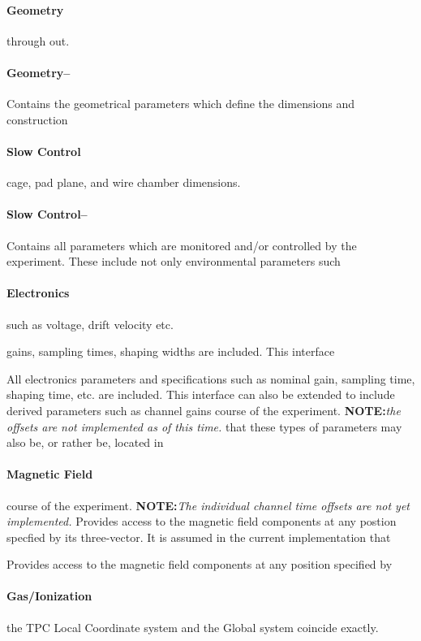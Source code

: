 \documentclass[twoside]{article}
\begin{document}
\paragraph{Geometry}
through out. 

\paragraph{Geometry--}

Contains the
geometrical parameters which define the dimensions and construction
\paragraph{Slow Control}
cage, pad plane, and wire chamber dimensions.

\paragraph{Slow Control--}

Contains all parameters which are monitored and/or controlled by 
the experiment.  These include not only environmental parameters such
\paragraph{Electronics}
such as voltage, drift velocity etc.

gains, sampling times, shaping widths are included.  This interface 

All electronics parameters and specifications such as nominal
gain, sampling time, shaping time, etc. are included.  This interface 
can also be extended to include derived parameters such as channel gains
course of the experiment.  {\bf NOTE:}{\em the offsets are not implemented as of this time.}
that these types of parameters may also be, or rather be, located in
\paragraph{Magnetic Field}
course of the experiment.  {\bf NOTE:}{\em The individual channel time offsets are not yet implemented.}
Provides access to the magnetic field components at any postion specfied by
its three-vector.  It is assumed in the current implementation that

Provides access to the magnetic field components at any position specified by
\paragraph{Gas/Ionization}
the TPC Local Coordinate system and the Global system coincide exactly.
\end{document}
